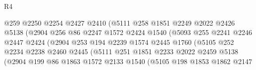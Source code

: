 \begin{lexlean}{R4}
\begin{coremodule}
                                @259
                                @2250
                                @2254
                                @2427
                                @2410
                                (@5111
                                  @258
                                  @1851
                                  @2249
                                  @2022
                                  @2426
                                  @5138
                                  (@2904
                                    @256
                                    @86
                                    @2247
                                    @1572
                                    @2424
                                    @1540
                                    (@5093
                                      @255
                                      @2241
                                      @2246
                                      @2447
                                      @2424
                                      (@2904
                                        @253
                                        @194
                                        @2239
                                        @1574
                                        @2445
                                        @1760
                                        (@5105
                                          @252
                                          @2234
                                          @2238
                                          @2460
                                          @2445
                                          (@5111
                                            @251
                                            @1851
                                            @2233
                                            @2022
                                            @2459
                                            @5138
                                            (@2904
                                              @199
                                              @86
                                              @1863
                                              @1572
                                              @2133
                                              @1540
                                              (@5105
                                                @198
                                                @1853
                                                @1862
                                                @2147

\end{coremodule}
\end{lexlean}
